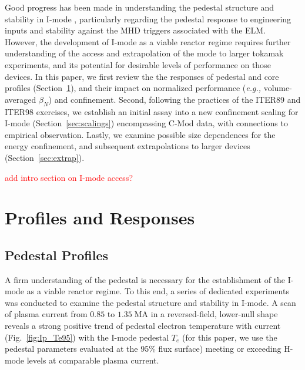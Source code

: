\documentclass[12pt]{iopart}
\newcommand{\eg}{\emph{e.g., }}
\renewcommand{\note}[1]{\textcolor{red}{#1}}
\begin{document}
Good progress has been made in understanding the pedestal structure and stability in I-mode \cite{Walk2014,Walk2014b}, particularly regarding the pedestal response to engineering inputs and stability against the MHD triggers associated with the ELM.
However, the development of I-mode as a viable reactor regime requires further understanding of the access and extrapolation of the mode to larger tokamak experiments, and its potential for desirable levels of performance on those devices.
In this paper, we first review the the responses of pedestal and core profiles (Section~\ref{sec:profiles}), and their impact on normalized performance (\eg volume-averaged $\beta_N$) and confinement.
Second, following the practices of the ITER89 \cite{Christiansen1992,Yushmanov1990} and ITER98 \cite{ITER1999} exercises, we establish an initial assay into a new confinement scaling for I-mode (Section~\ref{sec:scalings}) encompassing C-Mod data, with connections to empirical observation.
Lastly, we examine possible size dependences for the energy confinement, and subsequent extrapolations to larger devices (Section~\ref{sec:extrap}).

\note{add intro section on I-mode access?}

\section{Profiles and Responses}\label{sec:profiles}

\subsection{Pedestal Profiles}\label{subsec:ped}

A firm understanding of the pedestal is necessary for the establishment of the I-mode as a viable reactor regime.
To this end, a series of dedicated experiments \cite{Walk2014,Walk2014b} was conducted to examine the pedestal structure and stability in I-mode.
A scan of plasma current from $0.85$ to $1.35\;\mbox{MA}$ in a reversed-field, lower-null shape reveals a strong positive trend of pedestal electron temperature with current (Fig.~\ref{fig:Ip_Te95}) with the I-mode pedestal $T_e$ (for this paper, we use the pedestal parameters evaluated at the 95\% flux surface) meeting or exceeding H-mode levels at comparable plasma current.  
\end{document}
